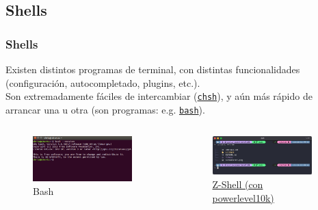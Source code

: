 \documentclass[aspectratio=43]{beamer}
\begin{document}
\subsection{Shells}

\begin{frame}
    \frametitle{Shells}
    Existen distintos programas de terminal, con distintas funcionalidades (configuración, autocompletado, plugins, etc.).\\
    Son extremadamente fáciles de intercambiar (\href{https://man7.org/linux/man-pages/man1/chsh.1.html}{\texttt{chsh}}), y aún más rápido de arrancar una u otra (son programas: e.g. \href{https://www.man7.org/linux/man-pages/man1/bash.1.html}{\texttt{bash}}). 

    \begin{columns}[c]
        \begin{column}{0.5\textwidth}
            \begin{figure}
                \centering
                \includegraphics[width=0.9\textwidth]{img/bash_shell.jpg}
                \caption{Bash}
            \end{figure}
        \end{column}
        \begin{column}{0.5\textwidth}
            \begin{figure}
                \centering
                \includegraphics[width=0.9\textwidth]{img/powerlevel10k.png}
                \caption{\href{https://www.zsh.org/}{Z-Shell }\href{https://github.com/romkatv/powerlevel10k}{(con powerlevel10k)}}
            \end{figure}
        \end{column}
    \end{columns}

\end{frame}
\end{document}
